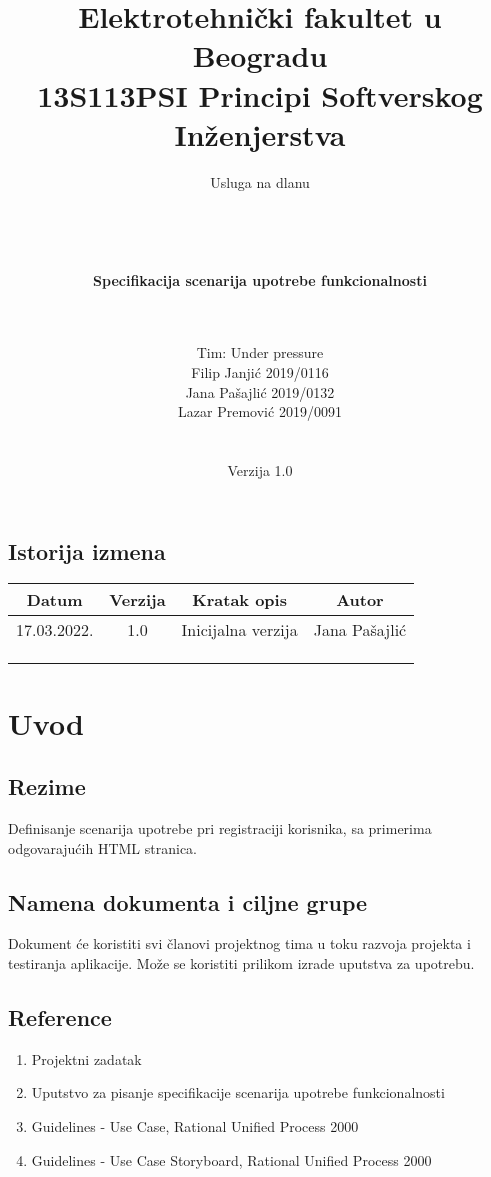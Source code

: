 \documentclass[a4paper,12pt]{report}
\title{\Large Elektrotehnički fakultet u Beogradu \\ 13S113PSI Principi Softverskog Inženjerstva}
\author{\Huge Usluga na dlanu\\ \ \\ \ \\ \ \\ \ \\
	\Large \textbf{Specifikacija scenarija upotrebe funkcionalnosti}\\\Large \textbf{\genitivfunkcionalnosti} \\ \ \\}
\date{\Large   Tim: Under pressure \\ Filip Janjić 2019/0116 \\ Jana Pašajlić 2019/0132 \\ Lazar Premović 2019/0091  \\ \  \\ \  \\\large Verzija 1.0}
\newcommand{\dativfunkcionalnosti }{registraciji korisnika}
\newcommand{\inicijalniautor}{Jana Pašajlić}
\newcommand{\inicijalnidatum}{17.03.2022.}
\begin{document}
\maketitle

\begin{center}
\section*{Istorija izmena}
\begin{tabular}{ |c|c|c|c| }
\hline
\textbf{Datum} & \textbf{Verzija} & \textbf{Kratak opis} & \textbf{Autor} \\ 
\hline
 \inicijalnidatum & 1.0  & Inicijalna verzija & \inicijalniautor \\
 \hline
 &  & &  \\
 \hline
 &  &  &  \\
 \hline
 &  &  &  \\
 \hline
\end{tabular}
\end{center}
\newpage

\tableofcontents

\newpage
\section{Uvod}
\subsection{Rezime}
Definisanje scenarija upotrebe pri \dativfunkcionalnosti, sa primerima odgovarajućih HTML stranica.
\subsection{Namena dokumenta i ciljne grupe}
Dokument će koristiti svi članovi projektnog tima u toku razvoja projekta i testiranja aplikacije. Može se koristiti prilikom izrade uputstva za upotrebu.
\subsection{Reference}
    \begin{enumerate}
        \item Projektni zadatak
        \item Uputstvo za pisanje specifikacije scenarija upotrebe funkcionalnosti 
        \item Guidelines - Use Case, Rational Unified Process 2000
        \item Guidelines - Use Case Storyboard, Rational Unified Process 2000
    \end{enumerate}
\end{document}
